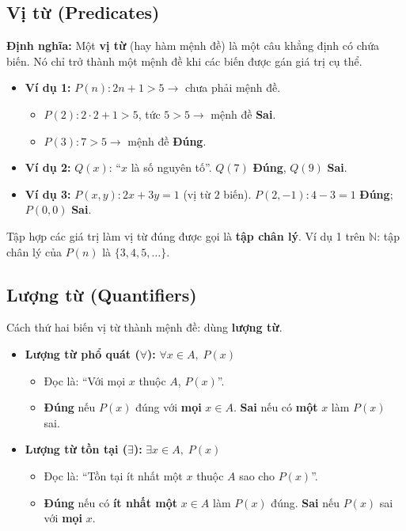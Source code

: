 \documentclass[12pt,a4paper]{article}
\begin{document}
\subsection{Vị từ (Predicates)}

\textbf{Định nghĩa:} Một \textbf{vị từ} (hay hàm mệnh đề) là một câu khẳng định có chứa biến. Nó chỉ trở thành một mệnh đề khi các biến được gán giá trị cụ thể.
\begin{itemize}
  \item \textbf{Ví dụ 1:} $P(n) : 2n + 1 > 5 \rightarrow$ chưa phải mệnh đề.
  \begin{itemize}
    \item $P(2) : 2 \cdot 2 + 1 > 5$, tức $5 > 5 \rightarrow$ mệnh đề \textcolor{AccentRed}{\textbf{Sai}}.
    \item $P(3) : 7 > 5 \rightarrow$ mệnh đề \textcolor{AccentGreen}{\textbf{Đúng}}.
  \end{itemize}
  \item \textbf{Ví dụ 2:} $Q(x)$: ``$x$ là số nguyên tố''. $Q(7)$ \textcolor{AccentGreen}{\textbf{Đúng}}, $Q(9)$ \textcolor{AccentRed}{\textbf{Sai}}.
  \item \textbf{Ví dụ 3:} $P(x, y) : 2x + 3y = 1$ (vị từ $2$ biến). $P(2, -1): 4 - 3 = 1$ \textcolor{AccentGreen}{\textbf{Đúng}}; $P(0, 0)$ \textcolor{AccentRed}{\textbf{Sai}}.
\end{itemize}

Tập hợp các giá trị làm vị từ đúng được gọi là \textbf{tập chân lý}. Ví dụ 1 trên $\mathbb{N}$: tập chân lý của $P(n)$ là $\{3, 4, 5, \dots\}$.

\subsection{Lượng từ (Quantifiers)}

Cách thứ hai biến vị từ thành mệnh đề: dùng \textbf{lượng từ}.
\begin{itemize}
  \item \textbf{Lượng từ phổ quát ($\forall$):} $\forall x \in A,\; P(x)$
  \begin{itemize}
    \item Đọc là: ``Với mọi $x$ thuộc $A$, $P(x)$''.
    \item \textcolor{AccentGreen}{\textbf{Đúng}} nếu $P(x)$ đúng với \textbf{mọi} $x \in A$. \textcolor{AccentRed}{\textbf{Sai}} nếu có \textbf{một} $x$ làm $P(x)$ sai.
  \end{itemize}
  \item \textbf{Lượng từ tồn tại ($\exists$):} $\exists x \in A,\; P(x)$
  \begin{itemize}
    \item Đọc là: ``Tồn tại ít nhất một $x$ thuộc $A$ sao cho $P(x)$''.
    \item \textcolor{AccentGreen}{\textbf{Đúng}} nếu có \textbf{ít nhất một} $x \in A$ làm $P(x)$ đúng. \textcolor{AccentRed}{\textbf{Sai}} nếu $P(x)$ sai với \textbf{mọi} $x$.
  \end{itemize}
\end{itemize}
\end{document}
